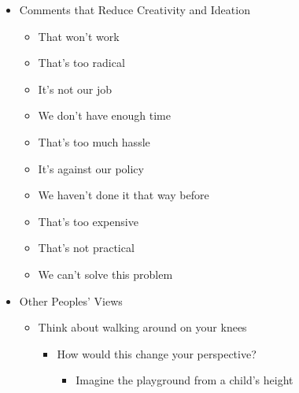 \begin{itemize}
\begin{itemize}
    \end{itemize}

  \item Comments that Reduce Creativity and Ideation

    \begin{itemize}

      \item That won't work

      \item That's too radical

      \item It's not our job

      \item We don't have enough time

      \item That's too much hassle

      \item It's against our policy

      \item We haven't done it that way before

      \item That's too expensive

      \item That's not practical

      \item We can't solve this problem

    \end{itemize}

  \item Other Peoples' Views

    \begin{itemize}

      \item Think about walking around on your knees

        \begin{itemize}

          \item How would this change your perspective?

            \begin{itemize}

              \item Imagine the playground from a child's height

            \end{itemize}

        \end{itemize}


\end{itemize}
\end{itemize}
